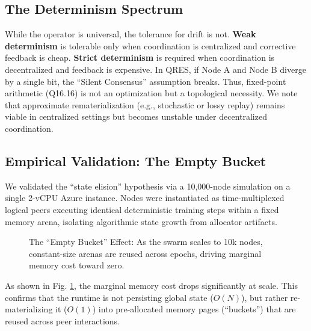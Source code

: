 \documentclass[conference]{IEEEtran}
\begin{document}
\subsection{The Determinism Spectrum}
While the operator is universal, the tolerance for drift is not. \textbf{Weak determinism} is tolerable only when coordination is centralized and corrective feedback is cheap. \textbf{Strict determinism} is required when coordination is decentralized and feedback is expensive. In QRES, if Node A and Node B diverge by a single bit, the ``Silent Consensus'' assumption breaks. Thus, fixed-point arithmetic (Q16.16) is not an optimization but a topological necessity. We note that approximate rematerialization (e.g., stochastic or lossy replay) remains viable in centralized settings but becomes unstable under decentralized coordination.

\subsection{Empirical Validation: The Empty Bucket}
We validated the ``state elision'' hypothesis via a 10,000-node simulation on a single 2-vCPU Azure instance. Nodes were instantiated as time-multiplexed logical peers executing identical deterministic training steps within a fixed memory arena, isolating algorithmic state growth from allocator artifacts.

\begin{figure}[htbp]
\centering
{}
\caption{The ``Empty Bucket'' Effect: As the swarm scales to 10k nodes, constant-size arenas are reused across epochs, driving marginal memory cost toward zero.}
\label{fig:memory}
\end{figure}

As shown in Fig. \ref{fig:memory}, the marginal memory cost drops significantly at scale. This confirms that the runtime is not persisting global state ($O(N)$), but rather re-materializing it ($O(1)$) into pre-allocated memory pages (``buckets'') that are reused across peer interactions.
\end{document}
